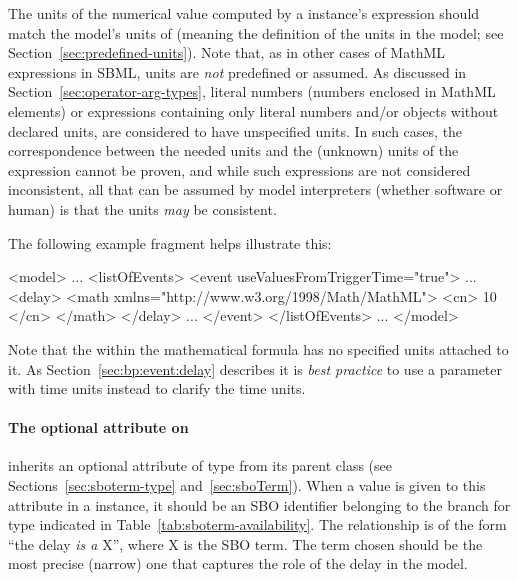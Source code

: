 The units of the numerical value computed by a \Delay instance's
 expression should match the model's units of
 (meaning the definition of the  units in
the model; see Section~\ref{sec:predefined-units}).  Note that, as
in other cases of MathML expressions in SBML, units are \emph{not}
predefined or assumed.  As discussed in
Section~\ref{sec:operator-arg-types}, literal numbers (\ie numbers
enclosed in MathML  elements) or expressions containing
only literal numbers and/or \Parameter objects without declared
units, are considered to have unspecified units.  In such cases,
the correspondence between the needed units and the (unknown)
units of the \Delay {} expression cannot be proven, and
while such expressions are not considered inconsistent, all that
can be assumed by model interpreters (whether software or human)
is that the units \emph{may} be consistent.

The following \Event example fragment helps illustrate this:
\label{sec:event:delay:example}

\begin{example}
<model>
    ...
    <listOfEvents>
        <event useValuesFromTriggerTime="true">
            ...
            <delay>
                <math xmlns="http://www.w3.org/1998/Math/MathML">
                    <cn> 10 </cn>
                </math>
            </delay>
            ...
        </event>
    </listOfEvents>
    ...
</model>
\end{example}

Note that the  within the mathematical formula has
no specified units attached to it. As Section~\ref{sec:bp:event:delay} describes 
it is \emph{best practice} to use a parameter with time units instead to clarify 
the time units. 

\paragraph{The optional  attribute on }
\label{sec:delay-sboterm}

\Delay  inherits an optional 
attribute of type  from its parent
class \SBase (see Sections~\ref{sec:sboterm-type}
and~\ref{sec:sboTerm}).  When a value is given to this
attribute in a  \Delay instance, it should be an
SBO identifier belonging to the branch for type  \Delay
indicated in Table~\ref{tab:sboterm-availability}.  The relationship is
of the form ``the delay \emph{is a} X'', where X is
the SBO term.  The term chosen should be the most precise (narrow)
one that captures the role of the delay  in the model.

